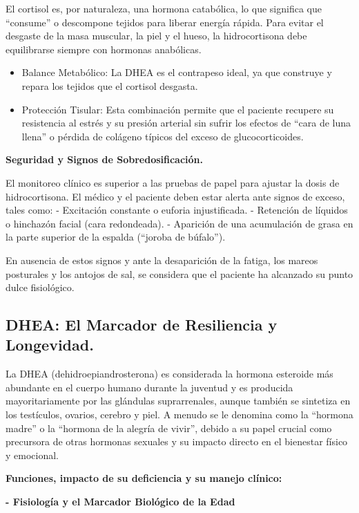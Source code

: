 \documentclass[
  spanish,
]{article}
\begin{document}
El cortisol es, por naturaleza, una hormona catabólica, lo que significa que ``consume'' o descompone tejidos para liberar energía rápida. Para evitar el desgaste de la masa muscular, la piel y el hueso, la hidrocortisona debe equilibrarse siempre con hormonas anabólicas.

\begin{itemize}
\item
  Balance Metabólico: La DHEA es el contrapeso ideal, ya que construye y repara los tejidos que el cortisol desgasta.
\item
  Protección Tisular: Esta combinación permite que el paciente recupere su resistencia al estrés y su presión arterial sin sufrir los efectos de ``cara de luna llena'' o pérdida de colágeno típicos del exceso de glucocorticoides.
\end{itemize}

\textbf{Seguridad y Signos de Sobredosificación.}

El monitoreo clínico es superior a las pruebas de papel para ajustar la dosis de hidrocortisona. El médico y el paciente deben estar alerta ante signos de exceso, tales como:
- Excitación constante o euforia injustificada.
- Retención de líquidos o hinchazón facial (cara redondeada).
- Aparición de una acumulación de grasa en la parte superior de la espalda (``joroba de búfalo'').

En ausencia de estos signos y ante la desaparición de la fatiga, los mareos posturales y los antojos de sal, se considera que el paciente ha alcanzado su punto dulce fisiológico.

\subsection{DHEA: El Marcador de Resiliencia y Longevidad.}\label{dhea-el-marcador-de-resiliencia-y-longevidad.}

La DHEA (dehidroepiandrosterona) es considerada la hormona esteroide más abundante en el cuerpo humano durante la juventud y es producida mayoritariamente por las glándulas suprarrenales, aunque también se sintetiza en los testículos, ovarios, cerebro y piel. A menudo se le denomina como la ``hormona madre'' o la ``hormona de la alegría de vivir'', debido a su papel crucial como precursora de otras hormonas sexuales y su impacto directo en el bienestar físico y emocional.

\textbf{Funciones, impacto de su deficiencia y su manejo clínico:}

\textbf{- Fisiología y el Marcador Biológico de la Edad}
\end{document}
